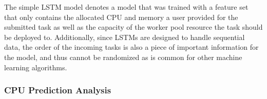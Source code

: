     The simple LSTM model denotes a  model that was trained with a feature set that only contains the allocated CPU and memory a user provided for the submitted task as well as the capacity of the worker pool resource the task should be deployed to. Additionally, since LSTMs are designed to handle sequential data, the order of the incoming tasks is also a piece of important information for the model, and thus cannot be randomized as is common for other machine learning algorithms.


    \subsubsection{CPU Prediction Analysis}
    \label{sec:cpu-prediction-analysis-simple-lstm-evaluation-scenarios}

